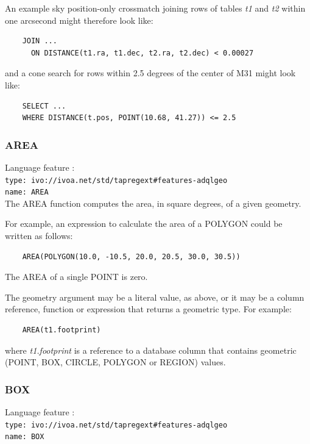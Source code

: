 \documentclass[11pt,a4paper]{ivoa}
\begin{document}
An example sky position-only crossmatch joining rows of tables
\textit{t1} and \textit{t2} within one arcsecond might therefore look like:
\begin{verbatim}
    JOIN ...
      ON DISTANCE(t1.ra, t1.dec, t2.ra, t2.dec) < 0.00027
\end{verbatim}
and a cone search for rows within 2.5 degrees of
the center of M31 might look like:
\begin{verbatim}
    SELECT ...
    WHERE DISTANCE(t.pos, POINT(10.68, 41.27)) <= 2.5
\end{verbatim}

\subsubsection{AREA}
\label{sec:functions.geom.area}
{\footnotesize Language feature :}\\
{\footnotesize \verb|type: ivo://ivoa.net/std/tapregext#features-adqlgeo|}\\
{\footnotesize \verb|name: AREA|}\\

The AREA function computes the area, in square degrees, of a given geometry.

For example, an expression to calculate the area of a POLYGON could be
written as follows:
\begin{verbatim}
    AREA(POLYGON(10.0, -10.5, 20.0, 20.5, 30.0, 30.5))
\end{verbatim}

The AREA of a single POINT is zero.

The geometry argument may be a literal value, as above, or it may be a
column reference, function or expression that returns a geometric type.
For example:
\begin{verbatim}
    AREA(t1.footprint)
\end{verbatim}
where \textit{t1.footprint} is a reference to a database column that
contains geometric (POINT, BOX, CIRCLE, POLYGON or REGION) values.

\subsubsection{BOX}
\label{sec:functions.geom.box}
{\footnotesize Language feature :}\\
{\footnotesize \verb|type: ivo://ivoa.net/std/tapregext#features-adqlgeo|}\\
{\footnotesize \verb|name: BOX|}\\
\end{document}
